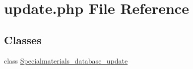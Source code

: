 \hypertarget{update_8php}{\section{update.\+php File Reference}
\label{update_8php}
}
\subsection*{Classes}
\begin{DoxyCompactItemize}
\item 
class \hyperlink{classSpecialmaterials__database__update}{Specialmaterials\+\_\+database\+\_\+update}
\end{DoxyCompactItemize}

